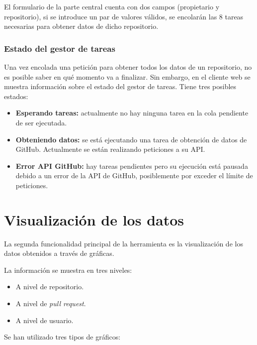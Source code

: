 El formulario de la parte central cuenta con dos campos (propietario y repositorio), si se introduce un par de valores válidos, se encolarán las 8 tareas necesarias para obtener datos de dicho repositorio.


\subsubsection{Estado del gestor de tareas}

Una vez encolada una petición para obtener todos los datos de un repositorio, no es posible saber en qué momento va a finalizar. Sin embargo, en el cliente web se muestra información sobre el estado del gestor de tareas. Tiene tres posibles estados:

\begin{itemize}
\tightlist
	\item \textbf{Esperando tareas:} actualmente no hay ninguna tarea en la cola pendiente de ser ejecutada.
	\item \textbf{Obteniendo datos:} se está ejecutando una tarea de obtención de datos de GitHub. Actualmente se están realizando peticiones a su API.
	\item \textbf{Error API GitHub:} hay tareas pendientes pero su ejecución está pausada debido a un error de la API de GitHub, posiblemente por exceder el límite de peticiones.
\end{itemize}


\section{Visualización de los datos}

La segunda funcionalidad principal de la herramienta es la visualización de los datos obtenidos a través de gráficas.

La información se muestra en tres niveles:

\begin{itemize}
	\item A nivel de repositorio.
	\item A nivel de \textit{pull request}.
	\item A nivel de usuario.
\end{itemize}

Se han utilizado tres tipos de gráficos:

